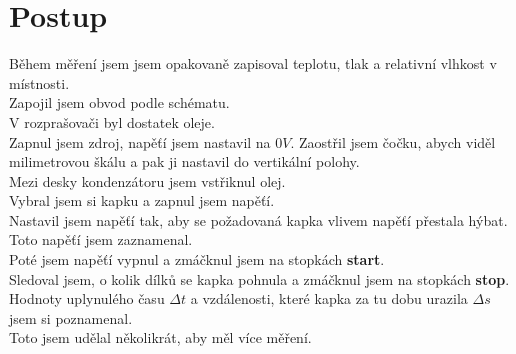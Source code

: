 \documentclass{article}
\begin{document}
\section{Postup}
Během měření jsem jsem opakovaně zapisoval teplotu, tlak a relativní vlhkost v místnosti.\\
Zapojil jsem obvod podle schématu.\\
V rozprašovači byl dostatek oleje.\\
Zapnul jsem zdroj, napěťí jsem nastavil na $0V$.
Zaostřil jsem čočku, abych viděl milimetrovou škálu a pak ji nastavil do vertikální polohy.\\
Mezi desky kondenzátoru jsem vstřiknul olej.\\
Vybral jsem si kapku a zapnul jsem napěťí.\\
Nastavil jsem napěťí tak, aby se požadovaná kapka vlivem napěťí přestala hýbat.\\
Toto napěťí jsem zaznamenal.\\
Poté jsem napěťí vypnul a zmáčknul jsem na stopkách \textbf{start}.\\
Sledoval jsem, o kolik dílků se kapka pohnula a zmáčknul jsem na stopkách \textbf{stop}.\\
Hodnoty uplynulého času $\Delta t$ a vzdálenosti, které kapka za tu dobu urazila $\Delta s$ jsem si poznamenal.\\
Toto jsem udělal několikrát, aby měl více měření.\\
\end{document}
